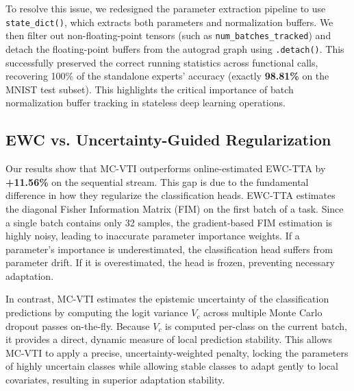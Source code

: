 \documentclass{article}
\theoremstyle{plain}
\theoremstyle{definition}
\theoremstyle{remark}
\begin{document}
To resolve this issue, we redesigned the parameter extraction pipeline to use \texttt{state\_dict()}, which extracts both parameters and normalization buffers. We then filter out non-floating-point tensors (such as \texttt{num\_batches\_tracked}) and detach the floating-point buffers from the autograd graph using \texttt{.detach()}. This successfully preserved the correct running statistics across functional calls, recovering 100\% of the standalone experts' accuracy (exactly \textbf{98.81\%} on the MNIST test subset). This highlights the critical importance of batch normalization buffer tracking in stateless deep learning operations.

\subsection{EWC vs. Uncertainty-Guided Regularization}
Our results show that MC-VTI outperforms online-estimated EWC-TTA by \textbf{+11.56\%} on the sequential stream. This gap is due to the fundamental difference in how they regularize the classification heads. EWC-TTA estimates the diagonal Fisher Information Matrix (FIM) on the first batch of a task. Since a single batch contains only 32 samples, the gradient-based FIM estimation is highly noisy, leading to inaccurate parameter importance weights. If a parameter's importance is underestimated, the classification head suffers from parameter drift. If it is overestimated, the head is frozen, preventing necessary adaptation.

In contrast, MC-VTI estimates the epistemic uncertainty of the classification predictions by computing the logit variance $V_c$ across multiple Monte Carlo dropout passes on-the-fly. Because $V_c$ is computed per-class on the current batch, it provides a direct, dynamic measure of local prediction stability. This allows MC-VTI to apply a precise, uncertainty-weighted penalty, locking the parameters of highly uncertain classes while allowing stable classes to adapt gently to local covariates, resulting in superior adaptation stability.
\end{document}
